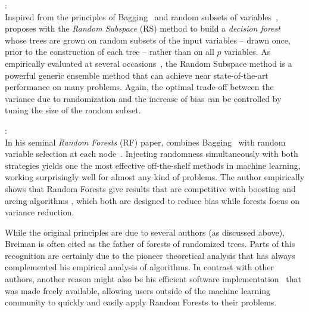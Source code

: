 \begin{description}
\item \citet{ho:1998}: \hfill \\
    Inspired from the principles of Bagging~\citep{breiman:1996b} and
    random subsets of variables~\citep{amit:1997}, \citet{ho:1998} proposes
    with the \textit{Random Subspace} (RS) method to build a \textit{decision
    forest} whose trees are grown on random subsets of the input variables
    -- drawn once, prior to the construction of each tree -- rather than on all $p$
    variables. As empirically evaluated at several
    occasions~\citep{ho:1998,panov:2007,louppe:2012}, the Random Subspace
    method is a powerful generic ensemble method that can achieve near state-of-the-art
    performance on many problems. Again, the optimal trade-off between the
    variance due to randomization  and the increase of bias can be controlled
    by tuning the size of the random subset.

\item \citet{breiman:2001}: \hfill \\
    In his seminal \textit{Random Forests} (RF) paper, \citet{breiman:2001} combines
    Bagging~\citep{breiman:1996b} with random variable selection at each
    node~\citep{amit:1997}. Injecting randomness simultaneously with both strategies  yields
    one the most effective off-the-shelf methods in machine learning, working
    surprisingly well for almost any kind of problems. The author empirically
    shows that Random Forests give results that are competitive with
    boosting \citep{freund:1995} and arcing algorithms \citep{breiman:1996},
    which both are designed to reduce bias while forests focus on variance
    reduction.

    While the original principles are due to several authors (as discussed
    above), Breiman is often cited as the father of forests of randomized trees. Parts of
    this recognition are certainly due to the pioneer theoretical analysis that
    has always complemented his empirical analysis of algorithms. In contrast
    with other authors, another reason might also be his efficient software
    implementation~\citep{breiman:2002} that was made freely available,
    allowing users outside of the machine learning community to quickly and
    easily apply Random Forests to their problems.


\end{description}
